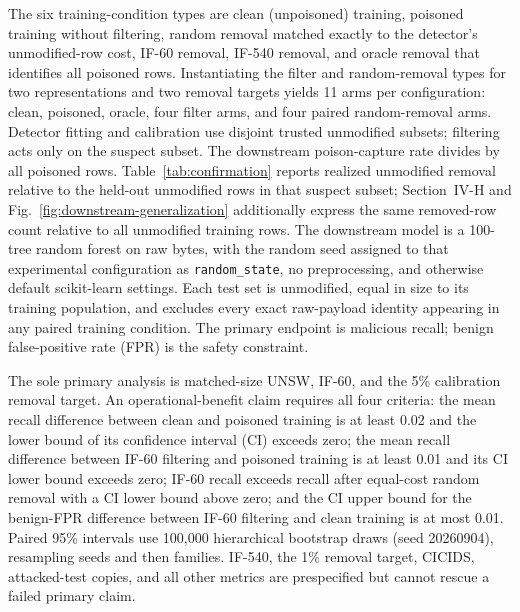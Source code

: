 \documentclass[conference]{IEEEtran}
\begin{document}
The six training-condition types are clean (unpoisoned) training, poisoned training without
filtering, random removal matched exactly to the detector's unmodified-row
cost, IF-60 removal, IF-540 removal, and oracle removal that identifies all
poisoned rows. Instantiating the filter and random-removal types for two
representations and two removal targets yields 11 arms per configuration:
clean, poisoned, oracle, four filter arms, and four paired random-removal arms.
Detector fitting and calibration use disjoint trusted
unmodified subsets; filtering acts only on the suspect subset. The downstream
poison-capture rate divides by all poisoned rows. Table~\ref{tab:confirmation}
reports realized unmodified removal relative to the held-out unmodified rows in
that suspect subset; Section~IV-H and Fig.~\ref{fig:downstream-generalization}
additionally express the same removed-row count relative to all unmodified
training rows. The downstream
model is a 100-tree random forest on raw bytes, with the random seed assigned to
that experimental configuration as
\texttt{random\_state}, no preprocessing, and otherwise default
scikit-learn settings. Each test set is unmodified, equal in size to its
training population, and excludes every exact raw-payload identity appearing in
any paired training condition. The primary endpoint is malicious recall; benign
false-positive rate (FPR) is the safety constraint.

The sole primary analysis is matched-size UNSW, IF-60, and the 5\% calibration
removal target. An operational-benefit claim requires all four criteria: the
mean recall difference between clean and poisoned training is at least 0.02 and
the lower bound of its confidence interval (CI) exceeds zero; the mean recall
difference between IF-60 filtering and poisoned training is at least 0.01 and
its CI lower bound exceeds zero; IF-60 recall exceeds recall after equal-cost
random removal with a CI lower bound above zero; and the CI upper bound for the
benign-FPR difference between IF-60 filtering and clean training is at most
0.01. Paired 95\% intervals use
100,000 hierarchical bootstrap draws (seed 20260904), resampling seeds and then
families. IF-540, the 1\% removal target, CICIDS, attacked-test copies, and all other
metrics are prespecified but cannot rescue a failed primary claim.
\end{document}
